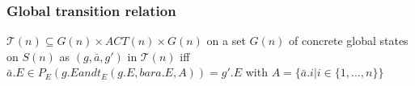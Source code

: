 \documentclass[hyperref={pdfpagelabels=false}]{beamer}
\begin{document}
\begin{frame}
  \frametitle{ Global transition relation }
  $ \mathcal{T}(n) \subseteq G(n) \times ACT(n) \times G(n)$ on a set $G(n)$ of concrete global states on $S(n)$ as $(g,\bar{a},g')$ in $\mathcal{T}(n)$ iff
  $\bar{a}.E \in P_E(g.E and t_E(g.E,bar{a}.E,A)) = g'.E$ with $A=\{\bar{a}.i | i \in \{1,...,n\}\}$

\end{frame}

\begin{frame}
  \frametitle{  }
\end{frame}

\begin{frame}
  \frametitle{  }
\end{frame}
\end{document}
